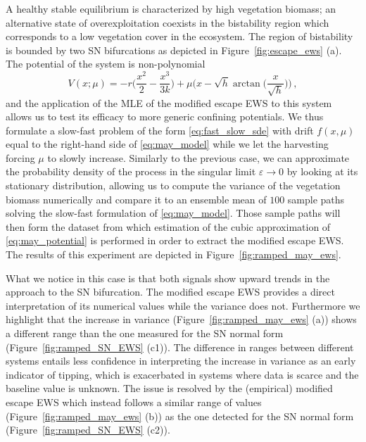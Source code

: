 \documentclass[a4paper,fleqn]{cas-sc}
\newcommand{\fref}[1]{Figure~\ref{#1}}
\begin{document}
A healthy stable equilibrium is characterized by high vegetation biomass; an alternative state of overexploitation coexists in the bistability region which corresponds to a low vegetation cover in the ecosystem.
The region of bistability is bounded by two SN bifurcations as depicted in \fref{fig:escape_ews} (a).
The potential of the system is non-polynomial
%
\begin{equation}\label{eq:may_potential}
        V(x;\mu) = -r\bigg(\frac{x^2}{2} - \frac{x^3}{3k}\bigg) + \mu\bigg(x - \sqrt{h}\arctan\bigg(\frac{x}{\sqrt{h}}\bigg)\bigg)\,,
\end{equation}
%
and the application of the MLE of the modified escape EWS to this system allows us to test its efficacy to more generic confining potentials.
We thus formulate a slow-fast problem of the form \eqref{eq:fast_slow_sde} with drift $f(x,\mu)$ equal to the right-hand side of \eqref{eq:may_model} while we let the harvesting forcing $\mu$ to slowly increase.
Similarly to the previous case, we can approximate the probability density of the process in the singular limit $\varepsilon\to0$ by looking at its stationary distribution, allowing us to compute the variance of the vegetation biomass numerically and compare it to an ensemble mean of $100$ sample paths solving the slow-fast formulation of \eqref{eq:may_model}.
Those sample paths will then form the dataset from which estimation of the cubic approximation of \eqref{eq:may_potential} is performed in order to extract the modified escape EWS.
The results of this experiment are depicted in \fref{fig:ramped_may_ews}.

What we notice in this case is that both signals show upward trends in the approach to the SN bifurcation.
The modified escape EWS provides a direct interpretation of its numerical values while the variance does not.
Furthermore we highlight that the increase in variance (\fref{fig:ramped_may_ews} (a)) shows a different range than the one measured for the SN normal form (\fref{fig:ramped_SN_EWS} (c1)).
The difference in ranges between different systems entails less confidence in interpreting the increase in variance as an early indicator of tipping, which is exacerbated in systems where data is scarce and the baseline value is unknown.
The issue is resolved by the (empirical) modified escape EWS which instead follows a similar range of values (\fref{fig:ramped_may_ews} (b)) as the one detected for the SN normal form (\fref{fig:ramped_SN_EWS} (c2)).
%
\end{document}
